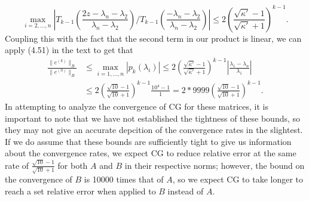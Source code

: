 \documentclass{article}
\begin{document}
\[
\max_{i=2,\ldots,n}\left|T_{k-1}\left(\frac{2z-\lambda_{n}-\lambda_2}{\lambda_{n}-\lambda_2}\right)\biggr/T_{k-1}\left(\frac{-\lambda_{n}-\lambda_2}{\lambda_{n}-\lambda_2}\right)\right|\leq2\left(\frac{\sqrt{\kappa'}-1}{\sqrt{\kappa'}+1}\right)^{k-1}.
\]
Coupling this with the fact that the second term in our product is linear, we can apply (4.51) in the text to get that
\begin{align*}
\frac{\| e^{(k)} \|_{B}}{\| e^{(0)} \|_{B}}&\leq \max_{i=1,\ldots,n}|p_k(\lambda_i)|\leq2\left(\frac{\sqrt{\kappa'}-1}{\sqrt{\kappa'}+1}\right)^{k-1}\left|\frac{\lambda_1-\lambda_n}{\lambda_1}\right|\\&\leq
2\left(\frac{\sqrt{10}-1}{\sqrt{10}+1}\right)^{k-1}\frac{10^4-1}{1}=2*9999\left(\frac{\sqrt{10}-1}{\sqrt{10}+1}\right)^{k-1}.
\end{align*}
In attempting to analyze the convergence of CG for these matrices, it is important to note that we have not established the tightness of these bounds, so they may not give an accurate depcition of the convergence rates in the slightest. If we do assume that these bounds are sufficiently tight to give us information about the convergence rates, we expect CG to reduce relative error at the same rate of $\frac{\sqrt{10}-1}{\sqrt{10}+1}$ for both $A$ and $B$ in their respective norms; however, the bound on the convergence of $B$ is 10000 times that of $A$, so we expect CG to take longer to reach a set relative error when applied to $B$ instead of $A$.
\end{document}
